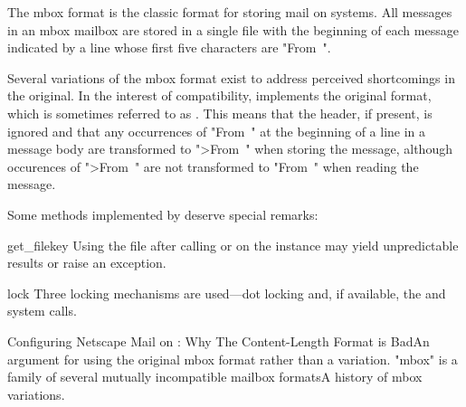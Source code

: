 The mbox format is the classic format for storing mail on \UNIX{} systems. All
messages in an mbox mailbox are stored in a single file with the beginning of
each message indicated by a line whose first five characters are "From~".

Several variations of the mbox format exist to address perceived shortcomings
in the original. In the interest of compatibility,  implements the
original format, which is sometimes referred to as . This means that
the  header, if present, is ignored and that any
occurrences of "From~" at the beginning of a line in a message body are
transformed to ">From~" when storing the message, although occurences of
">From~" are not transformed to "From~" when reading the message.

Some  methods implemented by  deserve special
remarks:

\begin{methoddesc}{get_file}{key}
Using the file after calling  or  on the
 instance may yield unpredictable results or raise an exception.
\end{methoddesc}

\begin{methoddesc}{lock}{}
Three locking mechanisms are used---dot locking and, if available, the
 and  system calls.
\end{methoddesc}

\begin{seealso}
    {Configuring Netscape Mail on \UNIX{}: Why The Content-Length Format is
    Bad}{An argument for using the original mbox format rather than a
    variation.}
    {"mbox" is a family of several mutually incompatible mailbox formats}{A
    history of mbox variations.}
\end{seealso}

\subsubsection{}
\label{mailbox-mh}

